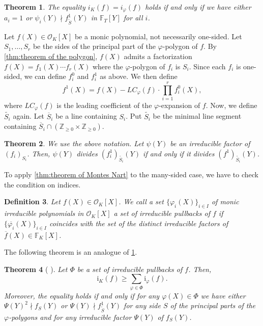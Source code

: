 \documentclass[10pt,a4paper]{amsart}
\newcommand{\field}[1]{\mathbb{#1}}
\newcommand{\Z}{\field{Z}}
\newcommand{\F}{\field{F}}
\newcommand{\Oint}{\mathcal{O}}
\newcommand{\iK}{\mathrm{i}_{K}}
\newcommand{\iphi}{\mathrm{i}_{\varphi}}
\newtheorem{theorem}{Theorem}[section]
\newtheorem{definition}[theorem]{Definition}
\numberwithin{equation}{section}
\begin{document}
    \begin{theorem}\label{thm:equivalent condition of Montes Nart}\cite[Criterion 1]{MR1152908}
      The equality $i_K(f) = i_{\varphi}(f)$ holds if and only if we have either 
      $a_i = 1$ or $\psi_i(Y) \nmid f^1_{\tilde{S}}(Y)$ in $\F_T[Y]$ for all $i$. 
    \end{theorem}

    Let $f(X) \in \mathcal{O}_K[X]$ be a monic polynomial, not necessarily one-sided.
    Let $S_1, \dots ,S_r$ be the sides of the principal part of the $\varphi$-polygon of $f$. 
    By \cref{thm:theorem of the polygon}, $f(X)$ admits a factorization 
    $f(X)=f_1(X) \cdots f_r(X)$ where the $\varphi$-polygon of $f_i$ is $S_{i}$. 
    Since each $f_i$ is one-sided, we can define $f_i^0$ and $f_i^1$ as above. 
    We then define 
    \[
      f^1(X)=f(X)-LC_{\varphi}(f) \cdot \prod_{i=1}^r f_i^0(X), 
    \]
    where $LC_{\varphi}(f)$ is the leading coefficient of the $\varphi$-expansion of $f$. 
    Now, we define $\widetilde{S_{i}}$ again.
    Let $\overline{S}_{i}$ be a line containing $S_{i}$.
    Put $\widetilde{S_{i}}$ be the minimal line segment containing $\overline{S}_{i} \cap (\Z_{\ge 0} \times \Z_{\ge 0})$. 

    \begin{theorem}\label{thm:criterion 2 of Montes Nart}\cite[Criterion 2]{MR1152908}
      We use the above notation. Let $\psi(Y)$ be an irreducible factor of $(f_i)_{S_{i}}$. 
      Then, $\psi(Y)$ divides $(f_i^1)_{\widetilde{S_{i}}}(Y)$ if and only if it divides $(f^1)_{\widetilde{S_{i}}}(Y)$. 
    \end{theorem}

    To apply \cref{thm:theorem of Montes Nart} to the many-sided case, 
    we have to check the condition on indices. 

    \begin{definition}
        Let $f(X) \in \Oint_{K}[X]$.
        We call a set $\{\varphi_{i}(X)\}_{i \in I}$ of monic irreducible polynomials in $\Oint_{K}[X]$
        a \emph{set of irreducible pullbacks} of $f$
        if $\{\overline{\varphi_{i}}(X)\}_{i \in I}$ coincides with 
        the set of the distinct irreducible factors of $\overline{f}(X) \in \F_{K}[X]$.
    \end{definition} 

    The following theorem is an analogue of \cref{thm:equivalent condition of Montes Nart}. 

    \begin{theorem}[{\cite[Theorem 2]{MR1152908} \cite[Theorem 3.1]{index}}]\label{thm:theorem of index}
        Let $\Phi$ be a set of irreducible pullbacks of $f$.
        Then,
        \[
            \iK(f) \ge \sum_{\varphi \in \Phi} \iphi(f). \label{1:ineq:thm}
        \]
        Moreover, the equality holds if and only if for any $\varphi(X) \in \Phi$
        we have either $\Psi(Y)^2 \nmid f_{S}(Y)$ or $\Psi(Y) \nmid f^{1}_{\tilde{S}}(Y)$
        for any side $S$ of the principal parts
        of the $\varphi$-polygons and
        for any irreducible factor $\Psi(Y)$ of $f_{S}(Y)$.
    \end{theorem}
\end{document}
